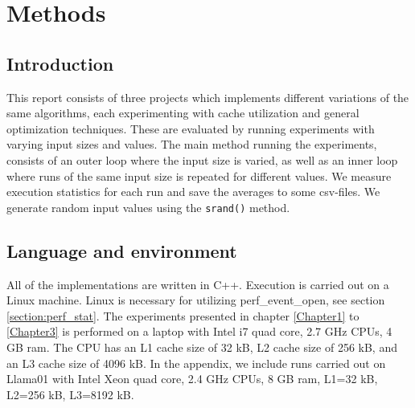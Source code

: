 
\chapter{Methods} %

\label{Chapter0} %


\section{Introduction}
This report consists of three projects which implements different variations of the same algorithms, each experimenting with cache utilization and general optimization techniques.
These are evaluated by running experiments with varying input sizes and values.
The main method running the experiments, consists of an outer loop where the input size is varied, as well as an inner loop where runs of the same input size is repeated for different values.
We measure execution statistics for each run and save the averages to some csv-files. 
We generate random input values using the \verb!srand()! method.


\section{Language and environment}
All of the implementations are written in C++. Execution is carried out on a
Linux machine. Linux is necessary for utilizing perf\_event\_open, see section
\ref{section:perf_stat}.
The experiments presented in chapter \ref{Chapter1} to \ref{Chapter3} is performed on a laptop with Intel i7 quad core, 2.7 GHz CPUs, 4 GB ram. The CPU has an L1 cache size of 32 kB, L2 cache size of 256 kB, and an L3 cache size of 4096 kB. 
In the appendix, we include runs carried out on Llama01 with Intel Xeon quad core, 2.4 GHz CPUs, 8 GB ram, L1=32 kB, L2=256 kB, L3=8192 kB.

